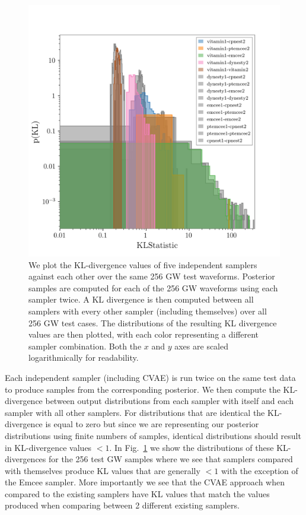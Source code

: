 \documentclass[%
showpacs,
 amsmath,amssymb,
 aps,
 twocolumn,
 prl,
 reprint,
floatfix,
]{revtex4-1}
\begin{document}
%
%
\begin{figure}
    \includegraphics[width=\columnwidth]{images/hist-kl.png}
    \caption{\label{fig:kl_results} We plot the KL-divergence values of
five independent samplers against each
other over the same 256 \ac{GW} test waveforms. Posterior samples are computed
for each of the 256 \ac{GW} waveforms using each sampler twice. A KL
divergence is then computed between all samplers with every other sampler
(including themselves) over all 256 \ac{GW} test cases. The distributions of the
resulting KL divergence values are then plotted, with each color representing a
different sampler combination. Both the $x$ and $y$ axes are scaled
logarithmically for readability.} 
\end{figure}
%

%
%
Each independent sampler (including \ac{CVAE}) is run twice on the same test
data to produce samples from the corresponding posterior. We then compute the
KL-divergence between output distributions from each sampler with itself and
each sampler with all other samplers. For distributions that are identical the
KL-divergence is equal to zero but since we are representing our posterior
distributions using finite numbers of samples, identical distributions should
result in KL-divergence values $<1$. In Fig.~\ref{fig:kl_results} we show the
distributions of these KL-divergences for the 256 test \ac{GW} samples where
we see that samplers compared with themselves produce KL values that are
generally $<1$ with the exception of the Emcee sampler. More importantly we see
that the \ac{CVAE} approach when compared to the existing samplers have KL
values that match the values produced when comparing between 2 different
existing samplers.
\end{document}
